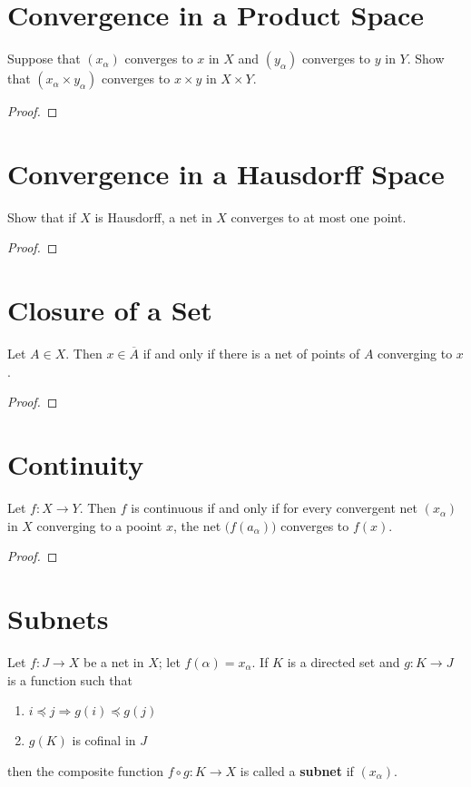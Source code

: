 \documentclass[12pt]{article}
\begin{document}
\section{Convergence in a Product Space}
Suppose that $(x_\alpha)$ converges to $x$ in $X$ and $(y_\alpha)$ converges to $y$ in $Y$. Show that $(x_\alpha \times y_\alpha)$ converges to $x \times y$ in $X \times Y$.
\begin{proof}
\end{proof}

\section{Convergence in a Hausdorff Space}
Show that if $X$ is Hausdorff, a net in $X$ converges to at most one point.
\begin{proof}
\end{proof}

\section{Closure of a Set}
\begin{thm}
	Let $A \in X$. Then $x \in \overline A$ if and only if there is a net of points of $A$ converging to $x$.
\end{thm}
\begin{proof}
\end{proof}

\section{Continuity}
\begin{thm}
	Let $f: X \to Y$. Then $f$ is continuous if and only if for every convergent net $(x_\alpha)$ in $X$ converging to a pooint $x$, the net $\big(f(a_\alpha)\big)$ converges to $f(x)$.
\end{thm}
\begin{proof}
\end{proof}

\section{Subnets}
\begin{defn}
	Let $f: J \to X$ be a net in $X$; let $f(\alpha) = x_\alpha$. If $K$ is a directed set and $g:K \to J$ is a function such that
	\begin{enumerate}
		\item $i \preceq j \Rightarrow g(i) \preceq g(j)$
		\item $g(K)$ is cofinal in $J$
	\end{enumerate}
	then the composite function $f \circ g : K \to X$ is called a \textbf{subnet} if $(x_\alpha)$.
\end{defn}
\end{document}
